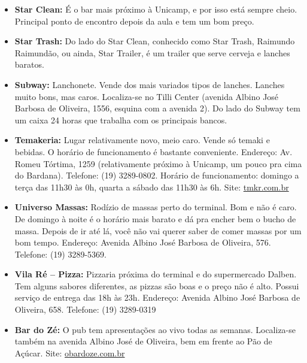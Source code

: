 \begin{itemize}
\item  \textbf{Star Clean:} É o bar mais próximo à Unicamp, e por isso está sempre cheio. Principal ponto de encontro depois da aula e tem um bom preço.
\end{itemize}

\begin{itemize}
\item  \textbf{Star Trash:} Do lado do Star Clean, conhecido como Star Trash, Raimundo Raimundão, ou ainda, Star Trailer, é um trailer que serve cerveja e lanches baratos.
\end{itemize}

\begin{itemize}
\item  \textbf{Subway:} Lanchonete. Vende dos mais variados tipos de lanches. Lanches muito bons, mas caros. Localiza-se no Tilli Center (avenida Albino José Barbosa de Oliveira, 1556, esquina com a avenida 2). Do lado do Subway tem um caixa 24 horas que trabalha com os principais bancos.
\end{itemize}

\begin{itemize}
\item  \textbf{Temakeria:} Lugar relativamente novo, meio caro. Vende só temaki e bebidas. O horário de funcionamento é bastante conveniente. Endereço: Av. Romeu Tórtima, 1259 (relativamente próximo à Unicamp, um pouco pra cima do Bardana). Telefone: (19) 3289-0802. Horário de funcionamento: domingo a terça das 11h30 às 0h, quarta a sábado das 11h30 às 6h. Site: \url{tmkr.com.br}
\end{itemize}

\begin{itemize}
\item  \textbf{Universo Massas:} Rodízio de massas perto do terminal. Bom e não é caro. De domingo à noite é o horário mais barato e dá pra encher bem o bucho de massa. Depois de ir até lá, você não vai querer saber de comer massas por um bom tempo. Endereço: Avenida Albino José Barbosa de Oliveira, 576. Telefone: (19) 3289-5369.
\end{itemize}

\begin{itemize}
\item  \textbf{Vila Ré -- Pizza:} Pizzaria próxima do terminal e do supermercado Dalben. Tem alguns sabores diferentes, as pizzas são boas e o preço não é alto. Possui serviço de entrega das 18h às 23h. Endereço: Avenida Albino José Barbosa de Oliveira, 658. Telefone: (19) 3289-0319
\end{itemize}

\begin{itemize}
\item  \textbf{Bar do Zé:} O pub tem apresentações ao vivo todas as semanas. Localiza-se também na avenida Albino José de Oliveira, bem em frente ao Pão de Açúcar. Site: \url{obardoze.com.br}
\end{itemize}

